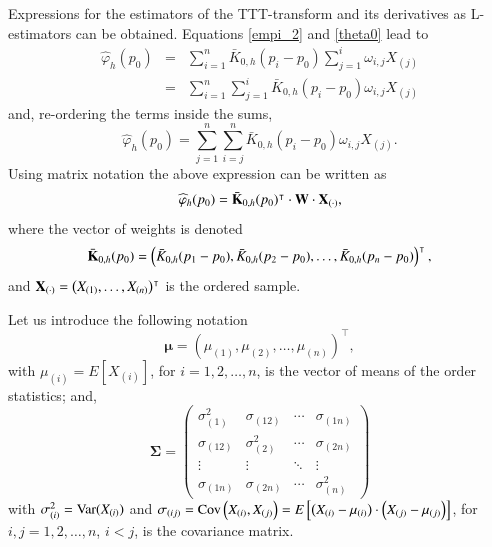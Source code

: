 \documentclass[preprint,12pt]{elsarticle}
\begin{document}
Expressions for the estimators of the TTT-transform and its derivatives as L-estimators can be obtained. 
\noindent Equations \eqref{empi_2} and  \eqref{theta0} lead to
\begin{eqnarray*}
\widehat{\varphi}_h(p_0)&=&\sum_{i=1}^n \bar{K}_{0,h}(p_i-p_0)\sum_{j=1}^i\omega_{i,j}X_{(j)} \\
&=& \sum_{i=1}^n \sum_{j=1}^i \bar{K}_{0,h}(p_i-p_0)\omega_{i,j}X_{(j)} 
\end{eqnarray*}
and, re-ordering the terms inside the sums, 
\begin{equation}%
\widehat{\varphi}_h(p_0)=  \sum_{j=1}^n \sum_{i=j}^n \bar{K}_{0,h}(p_i-p_0)\omega_{i,j}X_{(j)}. 
\end{equation}
Using matrix notation the above expression can be written as
\begin{equation}\label{L.estim1}
\widehat{\varphi}_h(p_0)=  \bar{\bf K}_{0,h}(p_0)^{\intercal} \cdot {\bf W} \cdot{\bf X}_{(\cdot)}, 
\end{equation}
where the vector of weights is denoted
$$\bar{\bf K}_{0,h}(p_0)=\left(\bar{K}_{0,h}(p_1-p_0), \bar{K}_{0,h}(p_2-p_0),\ldots,\bar{ K}_{0,h}(p_n-p_0)\right)^{\intercal},$$ and ${\bf X}_{(\cdot)}=\left(X_{(1)},\ldots,X_{(n)}\right)^{\intercal}$ is the ordered sample. 
%

\vskip0.3cm

Let us introduce the following notation
\begin{equation}\label{mean}
\boldsymbol{\mu}=\left({\mu}_{(1)},{\mu}_{(2)},\ldots,{\mu}_{(n)}\right)^{\intercal}, 
\end{equation}
with $\mu_{(i)}=E\left[X_{(i)}\right]$, for $i=1,2,\ldots,n$, is the vector of means of the order statistics;  and,  
\begin{equation}\label{var}
{\boldsymbol{\Sigma}}=\left(\begin{array}{cccc}
\sigma_{(1)}^2 & \sigma_{(12)} & \cdots & \sigma_{(1n)} \\
\sigma_{(12)} & \sigma_{(2)}^2 & \cdots & \sigma_{(2n)} \\
\vdots & \vdots & \ddots & \vdots \\
\sigma_{(1n)} & \sigma_{(2n)} & \cdots & \sigma_{(n)}^2
\end{array}\right)
\end{equation}
with $\sigma_{(i)}^2={\rm Var}(X_{(i)})$ and $\sigma_{(ij)}={\rm Cov} \left(X_{(i)},X_{(j)} \right)=E\left[\left(X_{(i)}-\mu_{(i)}\right)\cdot\left(X_{(j)}-\mu_{(j)} \right)\right]$, for $i, j= 1,2,\ldots,n$, $i<j$, is the covariance matrix. 
\end{document}
